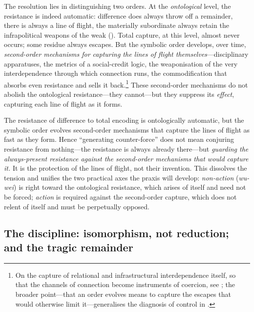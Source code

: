 The resolution lies in distinguishing two orders. At the \emph{ontological} level, the resistance is indeed automatic: difference does always throw off a remainder, there is always a line of flight, the materially subordinate always retain the infrapolitical weapons of the weak (). Total capture, at this level, almost never occurs; some residue always escapes. But the symbolic order develops, over time, \emph{second-order mechanisms for capturing the lines of flight themselves}---disciplinary apparatuses, the metrics of a social-credit logic, the weaponisation of the very interdependence through which connection runs, the commodification that absorbs even resistance and sells it back.\footnote{On the capture of relational and infrastructural interdependence itself, so that the channels of connection become instruments of coercion, see \textcite{farrell2019}; the broader point---that an order evolves means to capture the escapes that would otherwise limit it---generalises the diagnosis of control in \textcite{deleuze1987}.} These second-order mechanisms do not abolish the ontological resistance---they cannot---but they suppress its \emph{effect}, capturing each line of flight as it forms.

\begin{claim}
The resistance of difference to total encoding is ontologically automatic, but the symbolic order evolves second-order mechanisms that capture the lines of flight as fast as they form. Hence ``generating counter-force'' does not mean conjuring resistance from nothing---the resistance is always already there---but \emph{guarding the always-present resistance against the second-order mechanisms that would capture it.} It is the protection of the lines of flight, not their invention. This dissolves the tension and unifies the two practical axes the praxis will develop: \emph{non-action} (\emph{wu-wei}) is right toward the ontological resistance, which arises of itself and need not be forced; \emph{action} is required against the second-order capture, which does not relent of itself and must be perpetually opposed.
\end{claim}

\subsection{The discipline: isomorphism, not reduction; and the tragic remainder}
\label{p17:sub:balance-tragedy}

